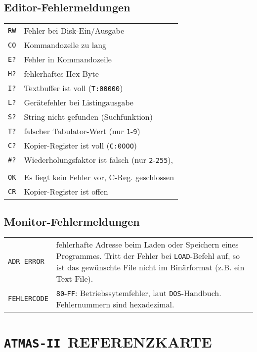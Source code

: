 \documentclass[10pt,a4paper,twoside,final,openright,titlepage]{memoir}
\def\atmas{\texttt{AT\-MAS-II }}
\begin{document}
\section{Editor-Fehlermeldungen}

\renewcommand{\arraystretch}{1.2}
\begin{longtable}{lp{25em}}
\texttt{RW} & Fehler bei Disk-Ein/Ausgabe \\
\texttt{CO} & Kommandozeile zu lang \\
\texttt{E?} & Fehler in Kommandozeile \\
\texttt{H?} & fehlerhaftes Hex-Byte \\
\texttt{I?} & Textbuffer ist voll (\texttt{T:00000}) \\
\texttt{L?} & Gerätefehler bei Listingausgabe \\
\texttt{S?} & String nicht gefunden (Suchfunktion) \\
\texttt{T?} & falscher Tabulator-Wert (nur \texttt{1}-\texttt{9}) \\
\texttt{C?} & Kopier-Register ist voll (\texttt{C:0OOO}) \\
\texttt{\#?} & Wiederholungsfaktor ist falsch (nur \texttt{2}-\texttt{255}), \\
 & \\
\texttt{OK} & Es liegt kein Fehler vor, C-Reg. geschlossen \\
\texttt{CR} & Kopier-Register ist offen \\
\end{longtable}
\renewcommand{\arraystretch}{1.8}
\bigskip

\section{Monitor-Fehlermeldungen}

\begin{longtable}{p{5em}p{25em}}
\texttt{ADR ERROR} & fehlerhafte Adresse beim Laden oder
	   Speichern eines Programmes. Tritt der
	   Fehler bei \texttt{LOAD}-Befehl auf, so ist das
	   gewünschte File nicht im Binärformat (z.B.
	   ein Text-File). \\

\texttt{FEHLERCODE} & \texttt{80}-\texttt{FF}: Betriebssytemfehler, laut \texttt{DOS}-Hand\-buch.
		Fehlernummern sind hexadezimal. \\
\end{longtable}

\chapter{\atmas REFERENZKARTE}
\end{document}
